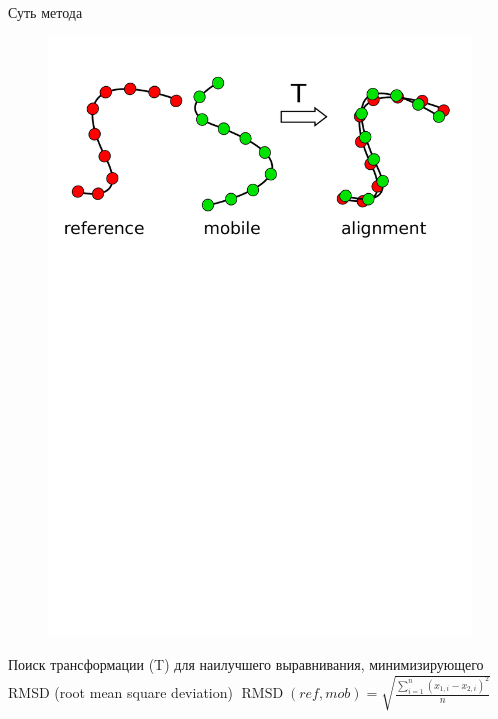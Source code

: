 \documentclass[utf8, professionalfont]{beamer}
\begin{document}
\begin{frame}{Суть метода}
\begin{figure}[h]
\includegraphics[clip, trim=0 19.5cm 0 1cm, width=\linewidth]{method.pdf}
\end{figure}

Поиск трансформации (T) для наилучшего выравнивания, минимизирующего RMSD (root mean square deviation)
\begin{math}
\operatorname{RMSD}(ref, mob) = \sqrt{\frac{\sum_{i=1}^n (x_{1,i} - x_{2,i})^2}{n}}
\end{math}

\end{frame}
\end{document}
